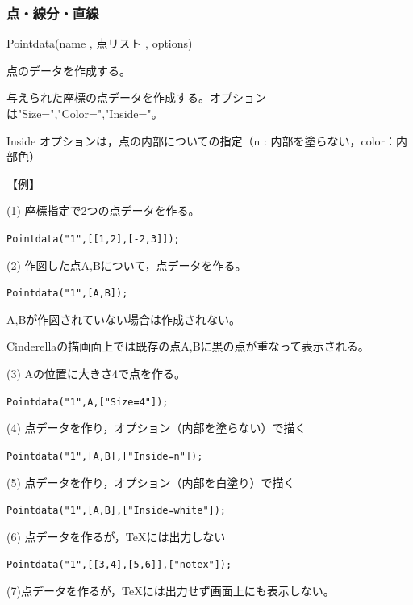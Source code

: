 \documentclass[papersize,a4paper,10pt,uplatex]{jsarticle}
\begin{document}
\subsubsection{点・線分・直線}
\begin{description}

\vspace{\baselineskip}
\hypertarget{pointdata}{}
\item[関数]Pointdata(name , 点リスト , options)
\item[機能]点のデータを作成する。
\item[説明]与えられた座標の点データを作成する。オプションは"Size=","Color=","Inside="。

Inside オプションは，点の内部についての指定（n : 内部を塗らない，color：内部色）

\vspace{\baselineskip}
【例】

(1) 座標指定で2つの点データを作る。

\hspace{10mm} \verb|Pointdata("1",[[1,2],[-2,3]]);|

(2) 作図した点A,Bについて，点データを作る。

\hspace{10mm} \verb|Pointdata("1",[A,B]);|

\hspace{5mm}A,Bが作図されていない場合は作成されない。

\hspace{5mm}Cinderellaの描画面上では既存の点A,Bに黒の点が重なって表示される。

(3) Aの位置に大きさ4で点を作る。

\hspace{10mm} \verb|Pointdata("1",A,["Size=4"]);|

(4) 点データを作り，オプション（内部を塗らない）で描く

\hspace{10mm}\verb|Pointdata("1",[A,B],["Inside=n"]);|

(5) 点データを作り，オプション（内部を白塗り）で描く

\hspace{10mm}\verb|Pointdata("1",[A,B],["Inside=white"]);|

(6) 点データを作るが，TeXには出力しない

\hspace{10mm}\verb|Pointdata("1",[[3,4],[5,6]],["notex"]);|

(7)点データを作るが，TeXには出力せず画面上にも表示しない。


\end{description}
\end{document}
